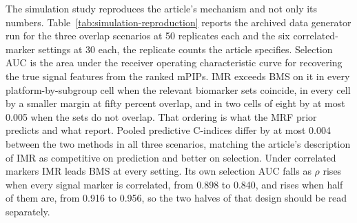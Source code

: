 \documentclass[article]{jss}
\begin{document}
The simulation study reproduces the article's mechanism and not only its
numbers. Table~\ref{tab:simulation-reproduction} reports the archived data
generator run for the three overlap scenarios at 50 replicates each and the six
correlated-marker settings at 30 each, the replicate counts the article
specifies. Selection AUC is the area under the receiver operating
characteristic curve for recovering the true signal features from the ranked
mPIPs. IMR exceeds BMS on it in every platform-by-subgroup cell
when the relevant biomarker sets coincide, in every cell by a smaller margin at
fifty percent overlap, and in two cells of eight by at most 0.005 when the sets
do not overlap. That ordering is what the MRF prior predicts and what
\citet{chekouo2017} report. Pooled predictive C-indices differ by at most 0.004
between the two methods in all three scenarios, matching the article's
description of IMR as competitive on prediction and better on selection. Under
correlated markers IMR leads BMS at every setting. Its own selection AUC falls
as $\rho$ rises when every signal marker is correlated, from 0.898 to 0.840,
and rises when half of them are, from 0.916 to 0.956, so the two halves of that
design should be read separately.
\end{document}
